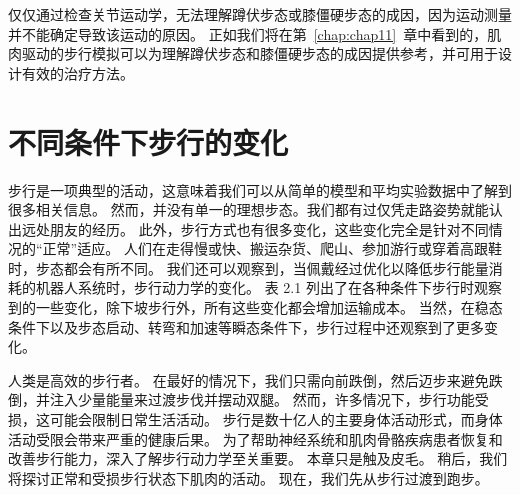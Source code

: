 仅仅通过检查关节运动学，无法理解蹲伏步态或膝僵硬步态的成因，因为运动测量并不能确定导致该运动的原因。
正如我们将在第~\ref{chap:chap11}~章中看到的，肌肉驱动的步行模拟可以为理解蹲伏步态和膝僵硬步态的成因提供参考，并可用于设计有效的治疗方法。


\section{不同条件下步行的变化}

步行是一项典型的活动，这意味着我们可以从简单的模型和平均实验数据中了解到很多相关信息。
然而，并没有单一的理想步态。我们都有过仅凭走路姿势就能认出远处朋友的经历。
此外，步行方式也有很多变化，这些变化完全是针对不同情况的“正常”适应。
人们在走得慢或快、搬运杂货、爬山、参加游行或穿着高跟鞋时，步态都会有所不同。
我们还可以观察到，当佩戴经过优化以降低步行能量消耗的机器人系统时，步行动力学的变化。
表 2.1 列出了在各种条件下步行时观察到的一些变化，除下坡步行外，所有这些变化都会增加运输成本。
当然，在稳态条件下以及步态启动、转弯和加速等瞬态条件下，步行过程中还观察到了更多变化。




人类是高效的步行者。
在最好的情况下，我们只需向前跌倒，然后迈步来避免跌倒，并注入少量能量来过渡步伐并摆动双腿。
然而，许多情况下，步行功能受损，这可能会限制日常生活活动。
步行是数十亿人的主要身体活动形式，而身体活动受限会带来严重的健康后果。
为了帮助神经系统和肌肉骨骼疾病患者恢复和改善步行能力，深入了解步行动力学至关重要。
本章只是触及皮毛。
稍后，我们将探讨正常和受损步行状态下肌肉的活动。
现在，我们先从步行过渡到跑步。













